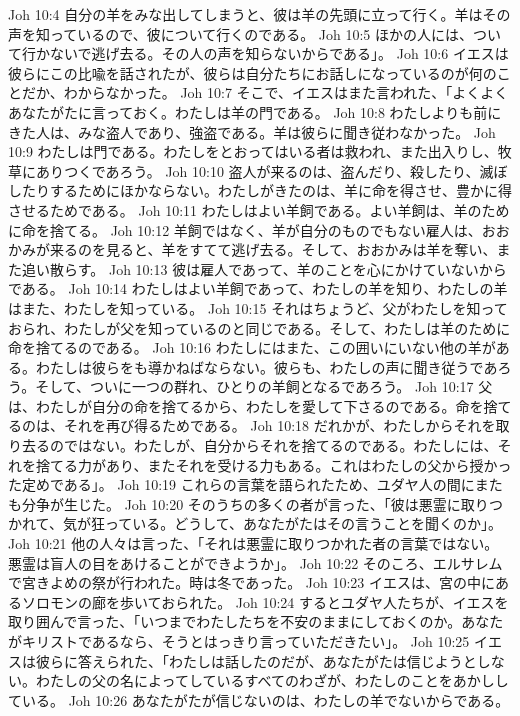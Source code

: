 Joh 10:4  自分の羊をみな出してしまうと、彼は羊の先頭に立って行く。羊はその声を知っているので、彼について行くのである。
Joh 10:5  ほかの人には、ついて行かないで逃げ去る。その人の声を知らないからである」。
Joh 10:6  イエスは彼らにこの比喩を話されたが、彼らは自分たちにお話しになっているのが何のことだか、わからなかった。
Joh 10:7  そこで、イエスはまた言われた、「よくよくあなたがたに言っておく。わたしは羊の門である。
Joh 10:8  わたしよりも前にきた人は、みな盗人であり、強盗である。羊は彼らに聞き従わなかった。
Joh 10:9  わたしは門である。わたしをとおってはいる者は救われ、また出入りし、牧草にありつくであろう。
Joh 10:10  盗人が来るのは、盗んだり、殺したり、滅ぼしたりするためにほかならない。わたしがきたのは、羊に命を得させ、豊かに得させるためである。
Joh 10:11  わたしはよい羊飼である。よい羊飼は、羊のために命を捨てる。
Joh 10:12  羊飼ではなく、羊が自分のものでもない雇人は、おおかみが来るのを見ると、羊をすてて逃げ去る。そして、おおかみは羊を奪い、また追い散らす。
Joh 10:13  彼は雇人であって、羊のことを心にかけていないからである。
Joh 10:14  わたしはよい羊飼であって、わたしの羊を知り、わたしの羊はまた、わたしを知っている。
Joh 10:15  それはちょうど、父がわたしを知っておられ、わたしが父を知っているのと同じである。そして、わたしは羊のために命を捨てるのである。
Joh 10:16  わたしにはまた、この囲いにいない他の羊がある。わたしは彼らをも導かねばならない。彼らも、わたしの声に聞き従うであろう。そして、ついに一つの群れ、ひとりの羊飼となるであろう。
Joh 10:17  父は、わたしが自分の命を捨てるから、わたしを愛して下さるのである。命を捨てるのは、それを再び得るためである。
Joh 10:18  だれかが、わたしからそれを取り去るのではない。わたしが、自分からそれを捨てるのである。わたしには、それを捨てる力があり、またそれを受ける力もある。これはわたしの父から授かった定めである」。
Joh 10:19  これらの言葉を語られたため、ユダヤ人の間にまたも分争が生じた。
Joh 10:20  そのうちの多くの者が言った、「彼は悪霊に取りつかれて、気が狂っている。どうして、あなたがたはその言うことを聞くのか」。
Joh 10:21  他の人々は言った、「それは悪霊に取りつかれた者の言葉ではない。悪霊は盲人の目をあけることができようか」。
Joh 10:22  そのころ、エルサレムで宮きよめの祭が行われた。時は冬であった。
Joh 10:23  イエスは、宮の中にあるソロモンの廊を歩いておられた。
Joh 10:24  するとユダヤ人たちが、イエスを取り囲んで言った、「いつまでわたしたちを不安のままにしておくのか。あなたがキリストであるなら、そうとはっきり言っていただきたい」。
Joh 10:25  イエスは彼らに答えられた、「わたしは話したのだが、あなたがたは信じようとしない。わたしの父の名によってしているすべてのわざが、わたしのことをあかししている。
Joh 10:26  あなたがたが信じないのは、わたしの羊でないからである。
